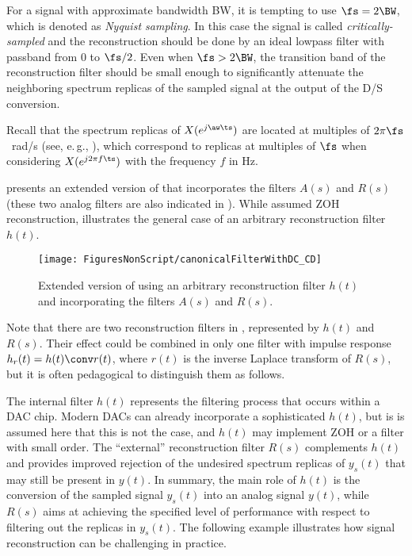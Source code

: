 For a signal with approximate bandwidth BW, it is tempting to use $\fs = 2 \BW$, which 
is denoted as \emph{Nyquist sampling}. In this case the signal
is called \emph{critically-sampled} and the reconstruction should be done by an ideal lowpass filter with passband from 0 to $\fs/2$. Even when 
$\fs > 2 \BW$, the transition band of the reconstruction filter should be small enough to significantly attenuate the neighboring spectrum replicas of the sampled signal at the output of the D/S conversion.

Recall that the spectrum replicas of $X(e^{j \aw \ts})$
are located at multiples of $2\pi \fs$~rad/s (see, e.\,g., ), which correspond to replicas at multiples of $\fs$ when considering $X(e^{j 2 \pi f \ts})$ with the frequency $f$ in Hz.


 presents an extended version of  
	that incorporates the filters $A(s)$ and $R(s)$ (these two analog filters are
	also indicated in ).
While   assumed ZOH reconstruction,  
illustrates the general case of an arbitrary reconstruction filter $h(t)$.

\begin{figure}
	\centering
		\texttt{[image: FiguresNonScript/canonicalFilterWithDC\_CD]}
	\caption{Extended version of  using an arbitrary reconstruction filter $h(t)$
	and incorporating the filters $A(s)$ and $R(s)$.\label{fig:canonicalFilterWithDC_CD}}
\end{figure}

Note that there are two reconstruction filters in , represented
by $h(t)$ and $R(s)$. Their effect could be combined in only one filter with impulse
response $h_r(t)=h(t) \conv r(t)$, where $r(t)$ is the inverse Laplace transform of $R(s)$, but
it is often pedagogical to distinguish them as follows.

The internal filter $h(t)$ represents the filtering process that
occurs within a DAC chip. Modern DACs can already incorporate a sophisticated $h(t)$, but
is is assumed here that this is not the case, and $h(t)$ may implement ZOH or a filter
with small order. The ``external'' reconstruction filter $R(s)$ complements $h(t)$ and
provides improved rejection of the undesired spectrum replicas of $y_s(t)$ that may still
be present in $y(t)$. In summary, the main role of $h(t)$ is the conversion of the
sampled signal $y_s(t)$ into an analog signal $y(t)$, while $R(s)$ aims at achieving
the specified level of performance with respect to filtering out the replicas in $y_s(t)$.
The following example illustrates how signal reconstruction can be challenging in practice.

